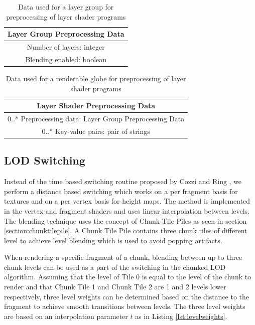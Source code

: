 \begin{table}
\centering 
\caption[]{Data used for a layer group for preprocessing of layer shader programs}
\label{table:layergrouppreprocessingdata}
\begin{tabular}{ c }    
    	\hline
        \textbf{Layer Group Preprocessing Data} \\ 
    	\hline
	Number of layers: integer \\
    	Blending enabled: boolean \\
	\hline
\end{tabular}
\end{table}

\begin{table}
\centering
\caption[]{Data used for a renderable globe for preprocessing of layer shader programs}
\label{table:layergrouppreprocessingdata}
\begin{tabular}{ c }
    
    	\hline
        \textbf{Layer Shader Preprocessing Data} \\ 
    	\hline
	0..* Preprocessing data: Layer Group Preprocessing Data \\
    	0..* Key-value pairs: pair of strings \\
    	\hline
    
\end{tabular}
\end{table}

\subsection{LOD Switching}
\label{section:lodswitching}
Instead of the time based switching routine proposed by Cozzi and Ring \cite{cozzi11}, we perform a distance based switching which works on a per fragment basis for textures and on a per vertex basis for height maps. The method is implemented in the vertex and fragment shaders and uses linear interpolation between levels. The blending technique uses the concept of Chunk Tile Piles as seen in section \ref{section:chunktilepile}. A Chunk Tile Pile contains three chunk tiles of different level to achieve level blending which is used to avoid popping artifacts. 

When rendering a specific fragment of a chunk, blending between up to three chunk levels can be used as a part of the switching in the chunked LOD algorithm. Assuming that the level of Tile 0 is equal to the level of the chunk to render and that Chunk Tile 1 and Chunk Tile 2 are 1 and 2 levels lower respectively, three level weights can be determined based on the distance to the fragment to achieve smooth transitions between levels. The three level weights are based on an interpolation parameter $t$ as in Listing \ref{lst:levelweights}.

